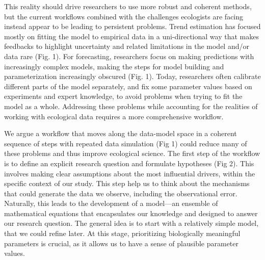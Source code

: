 \documentclass[11pt]{article}
\begin{document}
This reality should drive researchers to use more robust and coherent methods, but the current workflows combined with the challenges ecologists are facing instead appear to be leading to persistent problems. 
Trend estimation has focused mostly on fitting the model to empirical data in a uni-directional way that makes feedbacks to highlight uncertainty and related limitations in the model and/or data rare (Fig. 1). For forecasting, researchers focus on making predictions with increasingly complex models, making the steps for model building and parameterization increasingly obscured (Fig. 1). Today, researchers often calibrate different parts of the model separately, and fix some parameter values based on experiments and expert knowledge, to avoid problems when trying to fit the model as a whole. Addressing these problems while accounting for the realities of working with ecological data requires a more comprehensive workflow. 

We argue a workflow that moves along the data-model space in a coherent sequence of steps with repeated data simulation (Fig 1) could reduce many of these problems and thus improve ecological science.
The first step of the workflow is to define an explicit research question and formulate hypotheses (Fig 2). This involves making clear assumptions about the most influential drivers, within the specific context of our study. This step help us to think about the mechanisms that could generate the data we observe, including the observational error. Naturally, this leads to the development of a model---an ensemble of mathematical equations that encapsulates our knowledge and designed to answer our research question. The general idea is to start with a relatively simple model, that we could refine later. At this stage, prioritizing biologically meaningful parameters is crucial, as it allows us to have a sense of plausible parameter values. 
\end{document}
